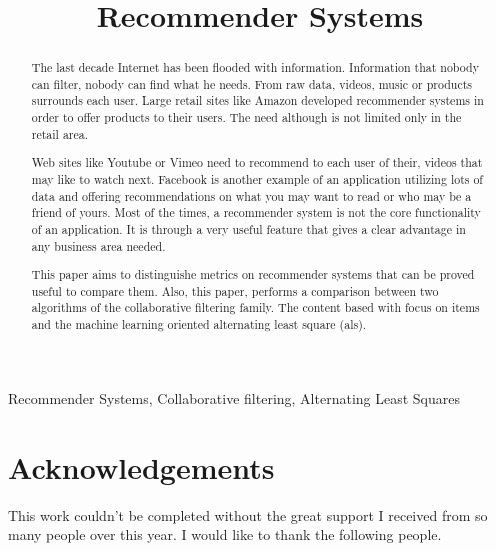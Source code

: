 \documentclass[10pt,journal]{IEEEtran}
\begin{document}
	
	\title{Recommender Systems} %
	\author{

		}

	\maketitle
	\begin{abstract}
		The last decade Internet has been flooded with information. Information that nobody can filter, nobody can find what he needs. From raw data, videos, music or products surrounds each user. Large retail sites like Amazon developed recommender systems in order to offer products to their users. The need although is not limited only in the retail area. 
		
		Web sites like Youtube or Vimeo need to recommend to each user of their, videos that may like to watch next. Facebook is another example of an application utilizing lots of data and offering recommendations on what you may want to read or who may be a friend of yours. Most of the times, a recommender system is not the core functionality of an application. It is through a very useful feature that gives a clear advantage in any business area needed.
		
		This paper aims to distinguishe metrics on recommender systems  that can be proved useful to compare them. Also, this paper, performs a comparison between two algorithms of the collaborative filtering family. The content based with focus on items and the machine learning oriented alternating least square (als).
	\end{abstract}
	\begin{IEEEkeywords}
		Recommender Systems, Collaborative filtering, Alternating Least Squares
	\end{IEEEkeywords}

	
	
	
	
	
	


\section*{Acknowledgements}
This work couldn't be completed without the great support I received from so many people over this year. I would like to thank the following people.
\end{document}
